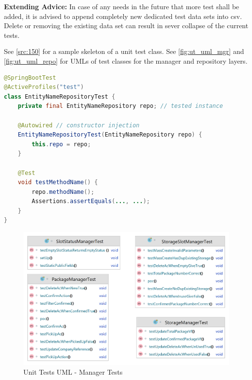 \bigskip
\textbf{Extending Advice:} In case of any needs in the future that more test shall be added, it is advised to append completely new dedicated test data sets into csv. Delete or removing the existing data set can result in sever collapse of the current tests.

\bigskip
See \autoref{src:150} for a sample skeleton of a unit test class. See \autoref{fig:ut_uml_mgr} and \autoref{fig:ut_uml_repo} for UMLs of test classes for the manager and repository layers.

\begin{lstlisting}[language={java}]
@SpringBootTest
@ActiveProfiles("test")
class EntityNameRepositoryTest {
    private final EntityNameRepository repo; // tested instance

    @Autowired // constructor injection
    EntityNameRepositoryTest(EntityNameRepository repo) {
        this.repo = repo; 
    }

    @Test
    void testMethodName() {
        repo.methodName();
        Assertions.assertEquals(..., ...);
    }
}
\end{lstlisting}

\begin{figure}[H]
    \centering
    \includegraphics[width=1\linewidth]{images/test/manager_tests.png}
    \caption{Unit Tests UML - Manager Tests}
    \label{fig:ut_uml_mgr}
\end{figure}


